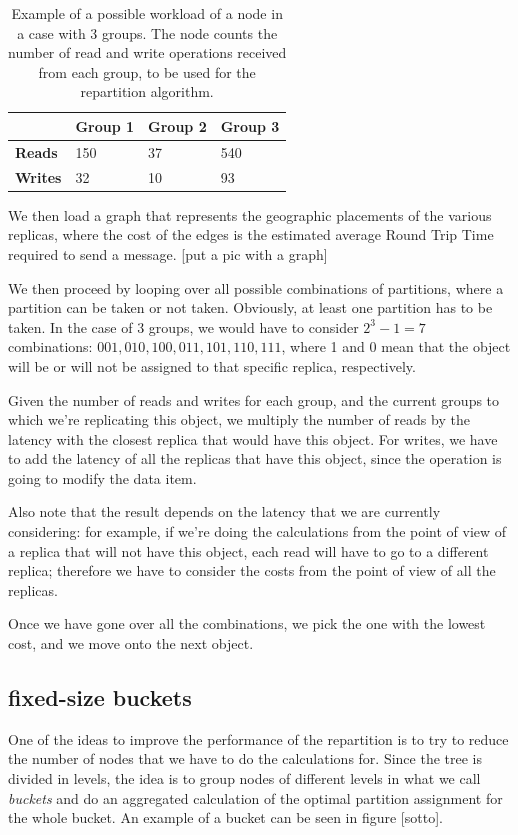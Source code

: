 \begin{table}[htb]
  \centering
  \begin{tabular}{l l l l}
    \hline
    & \textbf{Group 1} & \textbf{Group 2} & \textbf{Group 3} \\
    \hline
    \textbf{Reads} & 150 & 37 & 540 \\
    \textbf{Writes} & 32 & 10 & 93 \\
    \hline
  \end{tabular}
  \caption{Example of a possible workload of a node in a case with 3 groups. The node counts the number of read and write operations received from each group, to be used for the repartition algorithm.}\label{tab:workload-example}
\end{table}

We then load a graph that represents the geographic placements of the various replicas, where the cost of the edges is the estimated average Round Trip Time required to send a message.
[put a pic with a graph]

We then proceed by looping over all possible combinations of partitions, where a partition can be taken or not taken. Obviously, at least one partition has to be taken. In the case of 3 groups, we would have to consider $2^3 -1 = 7$ combinations: $001, 010, 100, 011, 101, 110, 111$, where 1 and 0 mean that the object will be or will not be assigned to that specific replica, respectively.

Given the number of reads and writes for each group, and the current groups to which we're replicating this object, we multiply the number of reads by the latency with the closest replica that would have this object. For writes, we have to add the latency of all the replicas that have this object, since the operation is going to modify the data item.

Also note that the result depends on the latency that we are currently considering: for example, if we're doing the calculations from the point of view of a replica that will not have this object, each read will have to go to a different replica; therefore we have to consider the costs from the point of view of all the replicas.

Once we have gone over all the combinations, we pick the one with the lowest cost, and we move onto the next object.

\subsection{fixed-size buckets}\label{sec:fixed-size buckets}
One of the ideas to improve the performance of the repartition is to try to reduce the number of nodes that we have to do the calculations for. Since the tree is divided in levels, the idea is to group nodes of different levels in what we call \emph{buckets} and do an aggregated calculation of the optimal partition assignment for the whole bucket. An example of a bucket can be seen in figure [sotto].


